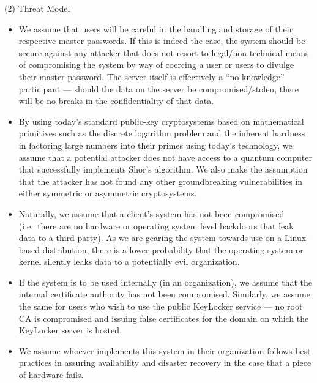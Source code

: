 \documentclass[11pt, letterpaper]{article}
\begin{document}
\noindent(2) Threat Model
\begin{itemize} \itemsep1pt \parskip0pt 
    \item We assume that users will be careful in the handling and storage of their respective master passwords. If this is indeed the case, the system should be secure against any attacker that does not resort to legal/non-technical means of compromising the system by way of coercing a user or users to divulge their master password. The server itself is effectively a “no-knowledge” participant --- should the data on the server be compromised/stolen, there will be no breaks in the confidentiality of that data.
    \item By using today’s standard public-key cryptosystems based on mathematical primitives such as the discrete logarithm problem and the inherent hardness in factoring large numbers into their primes using today’s technology, we assume that a potential attacker does not have access to a quantum computer that successfully implements Shor’s algorithm. We also make the assumption that the attacker has not found any other groundbreaking vulnerabilities in either symmetric or asymmetric cryptosystems.
    \item Naturally, we assume that a client’s system has not been compromised (i.e.\ there are no hardware or operating system level backdoors that leak data to a third party). As we are gearing the system towards use on a Linux-based distribution, there is a lower probability that the operating system or kernel silently leaks data to a potentially evil organization.
    \item If the system is to be used internally (in an organization), we assume that the internal certificate authority has not been compromised. Similarly, we assume the same for users who wish to use the public KeyLocker service --- no root \ac{CA} is compromised and issuing false certificates for the domain on which the KeyLocker server is hosted.
    \item We assume whoever implements this system in their organization follows best practices in assuring availability and disaster recovery in the case that a piece of hardware fails.
\end{itemize}
\end{document}
